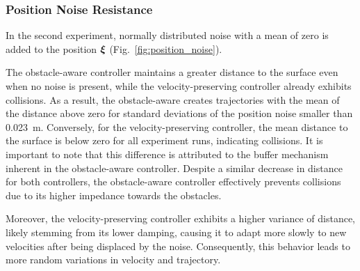 \subsubsection{Position Noise Resistance} \label{sec:position_noise}
In the second experiment, normally distributed noise with a mean of zero is added to the position $\boldsymbol{ \xi}$ (Fig.~\ref{fig:position_noise}). 

The obstacle-aware controller maintains a greater distance to the surface even when no noise is present, while the velocity-preserving controller already exhibits collisions. As a result, the obstacle-aware creates trajectories with the mean of the distance above zero for standard deviations of the position noise smaller than \qty{0.023}{m}. Conversely, for the velocity-preserving controller, the mean distance to the surface is below zero for all experiment runs, indicating collisions.
It is important to note that this difference is attributed to the buffer mechanism inherent in the obstacle-aware controller. Despite a similar decrease in distance for both controllers, the obstacle-aware controller effectively prevents collisions due to its higher impedance towards the obstacles.

Moreover, the velocity-preserving controller exhibits a higher variance of distance, likely stemming from its lower damping, causing it to adapt more slowly to new velocities after being displaced by the noise. Consequently, this behavior leads to more random variations in velocity and trajectory.

